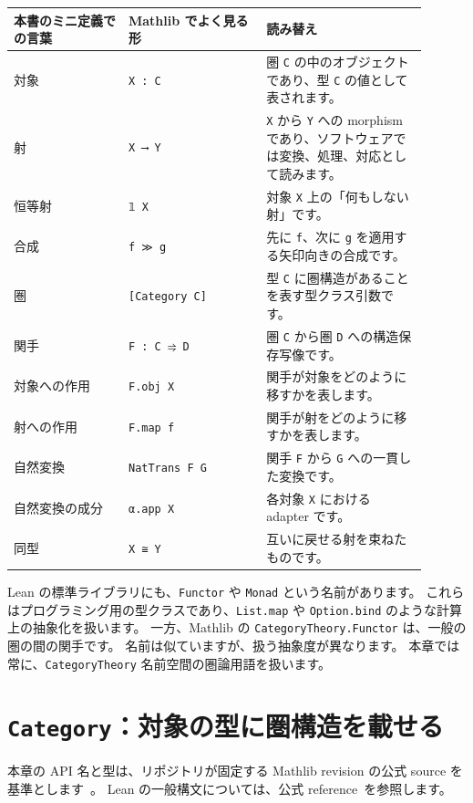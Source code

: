 \begin{longtable}{p{0.25\linewidth}p{0.30\linewidth}p{0.35\linewidth}}
\toprule
本書のミニ定義での言葉 & Mathlib でよく見る形 & 読み替え \\
\midrule
対象 & \texttt{X : C} & 圏 \texttt{C} の中のオブジェクトであり、型 \texttt{C} の値として表されます。 \\
射 & \texttt{X ⟶ Y} & \texttt{X} から \texttt{Y} への morphism であり、ソフトウェアでは変換、処理、対応として読みます。 \\
恒等射 & \texttt{𝟙 X} & 対象 \texttt{X} 上の「何もしない射」です。 \\
合成 & \texttt{f ≫ g} & 先に \texttt{f}、次に \texttt{g} を適用する矢印向きの合成です。 \\
圏 & \texttt{[Category C]} & 型 \texttt{C} に圏構造があることを表す型クラス引数です。 \\
関手 & \texttt{F : C ⥤ D} & 圏 \texttt{C} から圏 \texttt{D} への構造保存写像です。 \\
対象への作用 & \texttt{F.obj X} & 関手が対象をどのように移すかを表します。 \\
射への作用 & \texttt{F.map f} & 関手が射をどのように移すかを表します。 \\
自然変換 & \texttt{NatTrans F G} & 関手 \texttt{F} から \texttt{G} への一貫した変換です。 \\
自然変換の成分 & \texttt{α.app X} & 各対象 \texttt{X} における adapter です。 \\
同型 & \texttt{X ≅ Y} & 互いに戻せる射を束ねたものです。 \\
\bottomrule
\end{longtable}

Lean の標準ライブラリにも、\texttt{Functor} や \texttt{Monad} という名前があります。
これらはプログラミング用の型クラスであり、\texttt{List.map} や \texttt{Option.bind} のような計算上の抽象化を扱います。
一方、Mathlib の \texttt{CategoryTheory.Functor} は、一般の圏の間の関手です。
名前は似ていますが、扱う抽象度が異なります。
本章では常に、\texttt{CategoryTheory} 名前空間の圏論用語を扱います。

\section{\texttt{Category}：対象の型に圏構造を載せる}

本章の API 名と型は、リポジトリが固定する Mathlib revision の公式 source を基準とします~\cite{mathlib-category-theory-v430}。
Lean の一般構文については、公式 reference~\cite{lean4-reference}を参照します。

